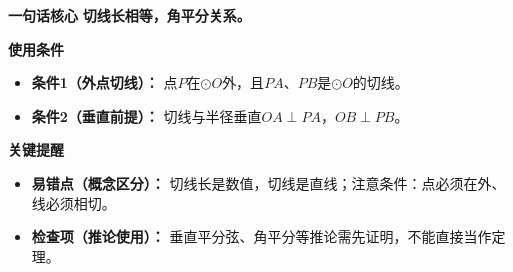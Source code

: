 \begin{summarybox}
	\textbf{\textcolor{CSummary}{一句话核心}}
	\textbf{切线长相等，角平分关系。}

	\medskip
	\textbf{\textcolor{CSummary}{使用条件}}
	\begin{itemize}[leftmargin=*, itemsep=0.5em, topsep=0.4em]
		\item \textbf{条件1（外点切线）：} 点$P$在$\odot O$外，且$PA$、$PB$是$\odot O$的切线。
		\item \textbf{条件2（垂直前提）：} 切线与半径垂直$OA\perp PA$，$OB\perp PB$。
	\end{itemize}

	\medskip
	\textbf{\textcolor{CSummary}{关键提醒}}
	\begin{itemize}[leftmargin=*, itemsep=0.5em, topsep=0.4em]
		\item \textbf{易错点（概念区分）：} 切线长是数值，切线是直线；注意条件：点必须在外、线必须相切。
		\item \textbf{检查项（推论使用）：} 垂直平分弦、角平分等推论需先证明，不能直接当作定理。
	\end{itemize}

\end{summarybox}
